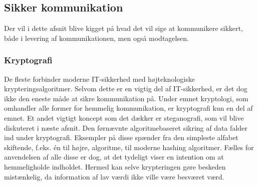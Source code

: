 \subsection{Sikker kommunikation}
Der vil i dette afsnit blive kigget på hvad det vil sige at kommunikere sikkert, både i levering af kommunikationen, men også modtagelsen. 

\subsubsection{Kryptografi}
De fleste forbinder moderne IT-sikkerhed med højteknologiske krypteringsalgoritmer. Selvom dette er en vigtig del af IT-sikkerhed, er det dog ikke den eneste måde at sikre kommunikation på. Under emnet kryptologi, som omhandler alle former for hemmelig kommunikation, er kryptografi kun en del af emnet. Et andet vigtigt koncept som det dækker er steganografi, som vil blive diskuteret i næste afsnit. Den førnævnte algoritmebaseret sikring af data falder ind under kryptografi. Eksempler på disse spænder fra den simpleste alfabet skiftende, f.eks. én til højre, algoritme, til moderne hashing algoritmer. Fælles for anvendelsen af alle disse er dog, at det tydeligt viser en intention om at hemmeligholde indholdet. Hermed kan selve krypteringen gøre beskeden mistænkelig, da information af lav værdi ikke ville være besværet værd.

